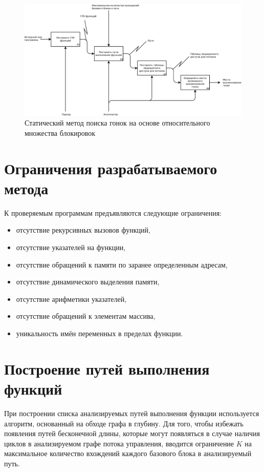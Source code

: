 \begin{figure}
  \centering
  \includegraphics[width=\textwidth]{inc/dia/idef0}
  \caption{Статический метод поиска гонок на основе относительного множества блокировок}
  \label{fig:idef0}
\end{figure}

\section{Ограничения разрабатываемого метода}

К проверяемым программам предъявляются следующие ограничения:
\begin{itemize}
  \item отсутствие рекурсивных вызовов функций,
  \item отсутствие указателей на функции,
  \item отсутствие обращений к памяти по заранее определенным адресам,
  \item отсутствие динамического выделения памяти,
  \item отсутствие арифметики указателей,
  \item отсутствие обращений к элементам массива,
  \item уникальность имён переменных в пределах функции.
\end{itemize}

 
\section{Построение путей выполнения функций}

При построении списка анализируемых путей выполнения функции используется алгоритм, основанный на обходе графа в глубину. Для того, чтобы избежать появления путей бесконечной длины, которые могут появляться в случае наличия циклов в анализируемом графе потока управления, вводится ограничение $K$ на максимальное количество вхождений каждого базового блока в анализируемый путь.

